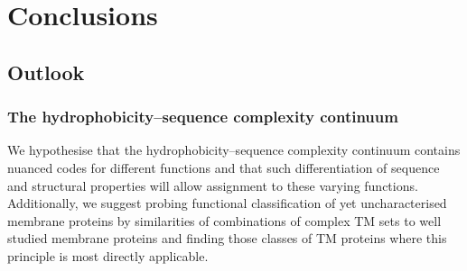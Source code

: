 \chapter{Conclusions}
\sloppy
\section{Outlook}
\subsection{The hydrophobicity\---sequence complexity continuum}
We hypothesise that the hydrophobicity\---sequence complexity continuum contains nuanced codes for different functions and that such differentiation of sequence and structural properties will allow assignment to these varying functions.
Additionally, we suggest probing functional classification of yet uncharacterised membrane proteins by similarities of combinations of complex TM sets to well studied membrane proteins and finding those classes of TM proteins where this principle is most directly applicable.
